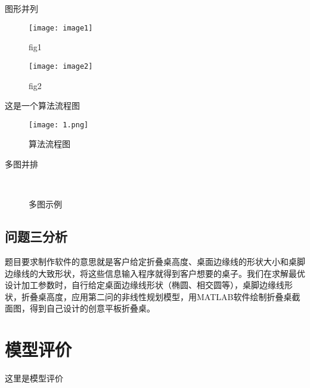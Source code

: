 \documentclass[bwprint,fontset=windows]{gmcmthesis}
\begin{document}
图形并列
\begin{figure}[htp!]
\begin{minipage}[t]{0.48\linewidth}
\centering
\texttt{[image: image1]}
\caption{fig1}
\label{fig:side:a}
\end{minipage}%
\begin{minipage}[t]{0.48\linewidth}
\centering
\texttt{[image: image2]}  %
\caption{fig2}
\label{fig:side:b}
\end{minipage}
\end{figure}


\clearpage
这是一个算法流程图
\begin{figure}[htp!]
\centering
\texttt{[image: 1.png]}
\caption{算法流程图}
\end{figure}

多图并排
\begin{figure}[!htp]
	\centering
	\qquad
	 \\
	\qquad
	\caption{多图示例}
\end{figure}


\subsection{问题三分析}


题目要求制作软件的意思就是客户给定折叠桌高度、桌面边缘线的形状大小和桌脚边缘线的大致形状，将这些信息输入程序就得到客户想要的桌子。我们在求解最优设计加工参数时，自行给定桌面边缘线形状（椭圆、相交圆等），桌脚边缘线形状，折叠桌高度，应用第二问的非线性规划模型，用MATLAB软件绘制折叠桌截面图，得到自己设计的创意平板折叠桌。


\section{模型评价}

这里是模型评价




\cite{mittelbach_latex_2004,wright_latex3_2009,beeton_unicode_2008,vieth_experiences_2009}
\end{document}
